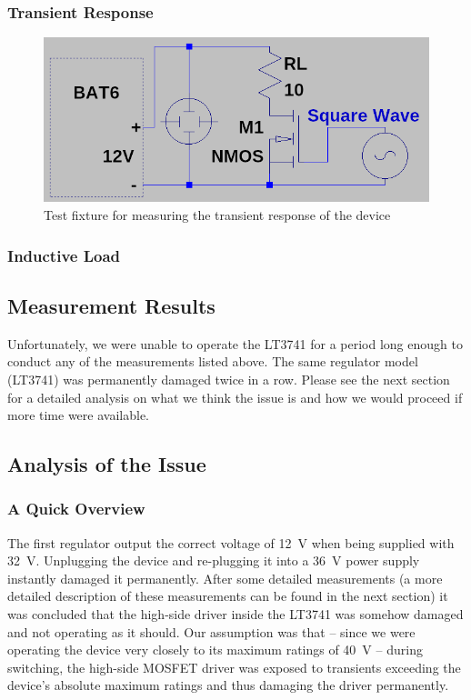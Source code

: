\subsubsection{Transient Response}

\begin{figure}[th!]
    \centering
    \includegraphics[width=.6\textwidth]{images/sim/transient-fixture.png}
    \caption{Test fixture for measuring the transient response of the device}
    \label{fig:verification:transient_fix}
\end{figure}


\subsubsection{Inductive Load}

\subsection{Measurement Results}

Unfortunately, we were unable to  operate the LT3741 for a period long enough to
conduct any of the measurements listed above.  The same regulator model (LT3741)
was  permanently  damaged  twice  in  a row. Please see the next section  for  a
detailed analysis on what we think the issue is and how we would proceed if more
time were available.


\subsection{Analysis of the Issue}

\subsubsection{A Quick Overview}

The first regulator output the  correct  voltage  of  \SI{12}{\volt}  when being
supplied with \SI{32}{\volt}.  Unplugging  the  device and re-plugging it into a
\SI{36}{\volt}  power  supply  instantly  damaged  it  permanently.  After  some
detailed measurements (a more detailed description of  these measurements can be
found in the next section) it was concluded that the high-side driver inside the
LT3741 was somehow damaged  and  not  operating as it should. Our assumption was
that -- since we were operating the device very  closely  to its maximum ratings
of  \SI{40}{\volt} -- during switching, the high-side MOSFET driver was  exposed
to transients exceeding the device's absolute maximum  ratings and thus damaging
the driver permanently.

